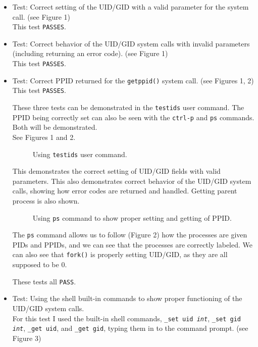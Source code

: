 \documentclass[11pt,letterpaper]{report}
\begin{document}
	\begin{itemize}
	
	\item Test: Correct setting of the UID/GID with a valid parameter for the system call. (see Figure 1)\\
	This test {\tt PASSES}.
	\item Test: Correct behavior of the UID/GID system calls with invalid parameters (including returning an error code). (see Figure 1)\\
	This test {\tt PASSES}.
	\item Test: Correct PPID returned for the {\tt getppid()} system call. (see Figures 1, 2)\\
	This test {\tt PASSES}.
	
	These three tests can be demonstrated in the {\tt testids} user command. The PPID being correctly set can also be seen with the {\tt ctrl-p} and {\tt ps} commands. Both will be demonstrated.\\
	See Figures 1 and 2.
	
\begin{figure}[h!]
	\centering
	\caption[uidgid]{Using {\tt testids} user command.}
	\label{fig:uidgidtestidstest}
\end{figure}
	
	This demonstrates the correct setting of UID/GID fields with valid parameters. This also demonstrates correct behavior of the UID/GID system calls, showing how error codes are returned and handled. Getting parent process is also shown.\\
	
\begin{figure}[h!]
	\centering
	\caption[uidgid]{Using {\tt ps} command to show proper setting and getting of PPID.}
	\label{fig:ppidpropersettingtest}
\end{figure}
	
	The {\tt ps} command allows us to follow (Figure 2) how the processes are given PIDs and PPIDs, and we can see that the processes are correctly labeled. We can also see that {\tt fork()} is properly setting UID/GID, as they are all supposed to be 0.
	
	These tests all {\tt PASS}.
	
	\item Test: Using the shell built-in commands to show proper functioning of the UID/GID system calls.\\
	For this test I used the built-in shell commands, {\tt \_set uid \emph{int}}, {\tt \_set gid \emph{int}}, {\tt \_get uid}, and {\tt \_get gid}, typing them in to the command prompt. (see Figure 3)
	

\end{itemize}
\end{document}
